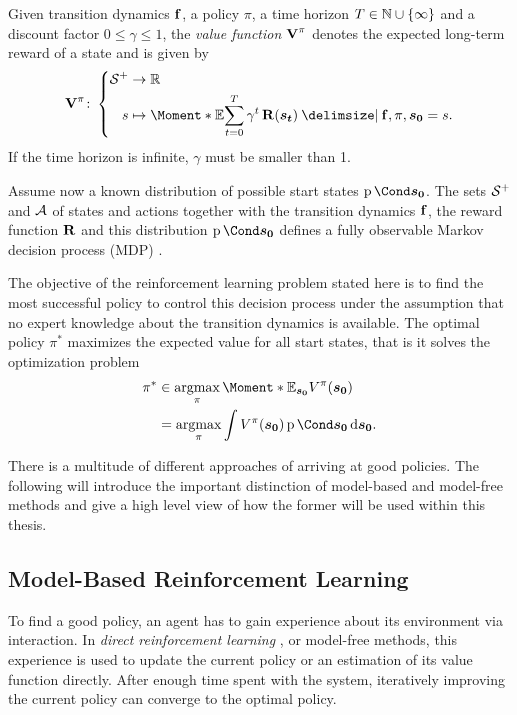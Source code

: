 \begin{definition}
    \label{def:value_function}
    Given transition dynamics $\operatorname{\mathbf{f}}$, a policy $\pi$, a time horizon $T \in \mathbb{N} \cup \left\{ \infty \right\}$ and a discount factor $0 \leq \gamma \leq 1$, the \emph{value function $\Vlu^\pi$} denotes the expected long-term reward of a state and is given by
    \begin{align}
        \Vlu^\pi \colon \left\{
            \begin{aligned}
                \Es^+ &\to \R \\
                s &\mapsto \Moment*{\E}{\sum_{t=0}^T \gamma^t \Rwd(\rv{s_t}) \given \Dyn, \pi, \rv{s_0} = s }.
            \end{aligned}
        \right.
    \end{align}
    If the time horizon is infinite, $\gamma$ must be smaller than 1.
\end{definition}

Assume now a known distribution of possible start states $\Prob{\rv{s_0}}$.
The sets $\mathcal{S}^+$ and $\mathcal{A}$ of states and actions together with the transition dynamics $\operatorname{\mathbf{f}}$, the reward function $\operatorname{\mathbf{R}}$ and this distribution $\Prob{\rv{s_0}}$ defines a fully observable Markov decision process (MDP) \cite{sutton_reinforcement_1998,murphy_machine_2012}.

The objective of the reinforcement learning problem stated here is to find the most successful policy to control this decision process under the assumption that no expert knowledge about the transition dynamics is available.
The optimal policy $\pi^*$ maximizes the expected value for all start states, that is it solves the optimization problem
\begin{align}
    \label{eq:optimal_policy}
    \begin{split}
        \pi^* &\in \argmax_{\pi} \Moment*{\E_{\rv{s_0}}}{V^\pi(\rv{s_0})} \\
        &= \argmax_{\pi} \int V^\pi(\rv{s_0}) \Prob{\rv{s_0}} \diff \rv{s_0}.
    \end{split}
\end{align}

There is a multitude of different approaches of arriving at good policies.
The following will introduce the important distinction of model-based and model-free methods and give a high level view of how the former will be used within this thesis.

\subsection{Model-Based Reinforcement Learning}
To find a good policy, an agent has to gain experience about its environment via interaction.
In \emph{direct reinforcement learning} \cite{sutton_reinforcement_1998}, or model-free methods, this experience is used to update the current policy or an estimation of its value function directly.
After enough time spent with the system, iteratively improving the current policy can converge to the optimal policy.

